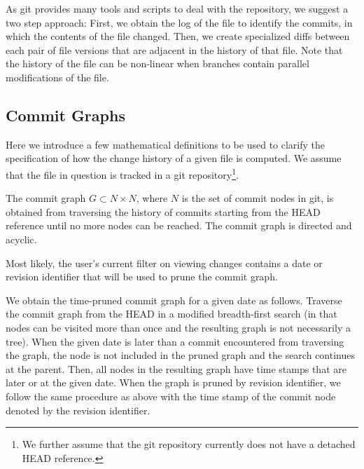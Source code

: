 As git provides many tools and scripts to deal with the repository, we suggest a two step approach:  First, we obtain the log of the file to identify the commits, in which the contents of the file changed.  Then, we create specialized diffs between each pair of file versions that are adjacent in the history of that file.  Note that the history of the file can be non-linear when branches contain parallel modifications of the file.

\subsection{Commit Graphs}

Here we introduce a few mathematical definitions to be used to clarify the specification of how the change history of a given file is computed.  We assume that the file in question is tracked in a git repository\footnote{We further assume that the git repository currently does not have a detached HEAD reference.}.

\begin{defi}
The commit graph $G \subset N \times N$, where $N$ is the set of commit nodes in git, is obtained from traversing the history of commits starting from the HEAD reference until no more nodes can be reached.  The commit graph is directed and acyclic. 
\end{defi}

Most likely, the user's current filter on viewing changes contains a date or revision identifier that will be used to prune the commit graph.

\begin{defi}
We obtain the time-pruned commit graph for a given date as follows.  Traverse the commit graph from the HEAD in a modified breadth-first search (in that nodes can be visited more than once and the resulting graph is not necessarily a tree).  When the given date is later than a commit encountered from traversing the graph, the node is not included in the pruned graph and the search continues at the parent.  Then, all nodes in the resulting graph have time stamps that are later or at the given date.
When the graph is pruned by revision identifier, we follow the same procedure as above with the time stamp of the commit node denoted by the revision identifier.
\end{defi}

